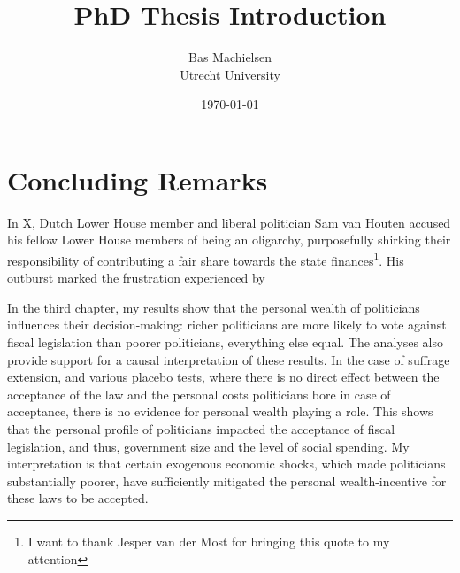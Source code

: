 

\title{\textbf{PhD Thesis Introduction}}
\author{Bas Machielsen \\ Utrecht University}
\date{\today}



\maketitle

\section{Concluding Remarks}

In X, Dutch Lower House member and liberal politician Sam van Houten accused his fellow Lower House members of being an oligarchy, purposefully shirking their responsibility of contributing a fair share towards the state finances\footnote{I want to thank Jesper van der Most for bringing this quote to my attention}. His outburst marked the frustration experienced by 


In the third chapter, my results show that the personal wealth of politicians influences their decision-making: richer politicians are more likely to vote against fiscal legislation than poorer politicians, everything else equal. The analyses also provide support for a causal interpretation of these results. In the case of suffrage extension, and various placebo tests, where there is no direct effect between the acceptance of the law and the personal costs politicians bore in case of acceptance, there is no evidence for personal wealth playing a role. This shows that the personal profile of politicians impacted the acceptance of fiscal legislation, and thus, government size and the level of social spending. My interpretation is that certain exogenous economic shocks, which made politicians substantially poorer, have sufficiently mitigated the personal wealth-incentive for these laws to be accepted. 


